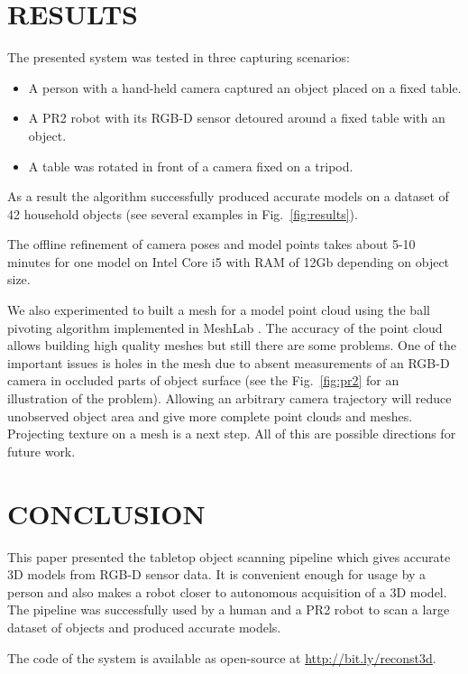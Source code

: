 \documentclass[letterpaper, 10 pt, conference]{ieeeconf}  %
\begin{document}
\section{RESULTS}
 
The presented system was tested in three capturing scenarios:

\begin{itemize}
 \item A person with a hand-held camera captured an object placed on a fixed table.
 \item A PR2 robot with its RGB-D sensor detoured around a fixed table with an object.
 \item A table was rotated in front of a camera fixed on a tripod.
\end{itemize}

As a result the algorithm successfully produced accurate models 
on a dataset of 42 household objects
(see several examples in Fig.~\ref{fig:results}).

The offline refinement of camera poses 
and model points takes about 5-10 minutes for one model on Intel Core i5 with RAM of 12Gb 
depending on object size.

We also experimented to built a mesh for a model point cloud using 
the ball pivoting algorithm \cite{bernardini1999ball}
implemented in MeshLab \cite{meshlab}. The accuracy of 
the point cloud allows building high quality meshes but still there
are some problems. One of the important issues is holes in 
the mesh due to absent measurements of an RGB-D camera in occluded parts of object surface 
(see the Fig.~\ref{fig:pr2} for an illustration of the problem).
Allowing an arbitrary camera 
trajectory will reduce unobserved object area and give more complete
point clouds and meshes. Projecting texture on a mesh is a next step.
All of this are possible directions for future work.


\section{CONCLUSION}

This paper presented the tabletop object scanning pipeline
which gives accurate 3D models from RGB-D sensor data.
It is convenient enough for usage by a person and also makes a robot closer
to autonomous acquisition of a 3D model. The pipeline 
was successfully used by a human and a PR2 robot 
to scan a large dataset of objects and produced 
accurate models.

The code of the system is available as open-source at
\href{http://bit.ly/reconst3d}{http://bit.ly/reconst3d}.
\end{document}
